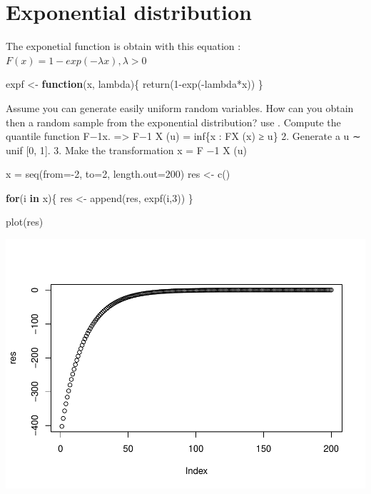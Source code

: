 \documentclass[
]{article}
\newenvironment{Shaded}{\begin{snugshade}}{\end{snugshade}}
\newcommand{\AttributeTok}[1]{\textcolor[rgb]{0.77,0.63,0.00}{#1}}
\newcommand{\ControlFlowTok}[1]{\textcolor[rgb]{0.13,0.29,0.53}{\textbf{#1}}}
\newcommand{\DecValTok}[1]{\textcolor[rgb]{0.00,0.00,0.81}{#1}}
\newcommand{\FunctionTok}[1]{\textcolor[rgb]{0.00,0.00,0.00}{#1}}
\newcommand{\NormalTok}[1]{#1}
\newcommand{\OtherTok}[1]{\textcolor[rgb]{0.56,0.35,0.01}{#1}}
\newcommand{\SpecialCharTok}[1]{\textcolor[rgb]{0.00,0.00,0.00}{#1}}
\begin{document}
\hypertarget{exponential-distribution}{%
\section{Exponential distribution}\label{exponential-distribution}}

The exponetial function is obtain with this equation :
\(F(x) = 1-exp(-λx), λ>0\)

\begin{Shaded}
\begin{Highlighting}[]
\NormalTok{expf }\OtherTok{\textless{}{-}} \ControlFlowTok{function}\NormalTok{(x, lambda)\{}
  \FunctionTok{return}\NormalTok{(}\DecValTok{1}\SpecialCharTok{{-}}\FunctionTok{exp}\NormalTok{(}\SpecialCharTok{{-}}\NormalTok{lambda}\SpecialCharTok{*}\NormalTok{x))}
\NormalTok{\}}
\end{Highlighting}
\end{Shaded}

Assume you can generate easily uniform random variables. How can you
obtain then a random sample from the exponential distribution? use .
Compute the quantile function F−1x. =\textgreater{} F−1 X (u) = inf\{x :
FX (x) ≥ u\} 2. Generate a u ∼ unif {[}0, 1{]}. 3. Make the
transformation x = F −1 X (u)

\begin{Shaded}
\begin{Highlighting}[]
\NormalTok{x }\OtherTok{=} \FunctionTok{seq}\NormalTok{(}\AttributeTok{from=}\SpecialCharTok{{-}}\DecValTok{2}\NormalTok{, }\AttributeTok{to=}\DecValTok{2}\NormalTok{, }\AttributeTok{length.out=}\DecValTok{200}\NormalTok{)}
\NormalTok{res }\OtherTok{\textless{}{-}} \FunctionTok{c}\NormalTok{()}

\ControlFlowTok{for}\NormalTok{(i }\ControlFlowTok{in}\NormalTok{ x)\{}
\NormalTok{  res }\OtherTok{\textless{}{-}} \FunctionTok{append}\NormalTok{(res, }\FunctionTok{expf}\NormalTok{(i,}\DecValTok{3}\NormalTok{))}
\NormalTok{\}}

\FunctionTok{plot}\NormalTok{(res)}
\end{Highlighting}
\end{Shaded}

\includegraphics{Exercicen2_files/figure-latex/unnamed-chunk-6-1.pdf}
\end{document}
